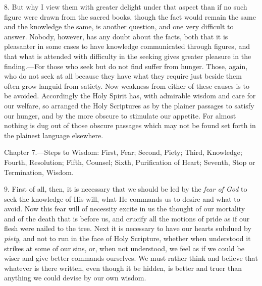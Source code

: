 8. But why I view them with greater delight under that aspect than if no such figure were drawn from the sacred books, though the fact would remain the same and the knowledge the same, is another question, and one very difficult to answer. Nobody, however, has any doubt about the facts, both that it is pleasanter in some cases to have knowledge communicated through figures, and that what is attended with difficulty in the seeking gives greater pleasure in the finding.—For those who seek but do not find suffer from hunger. Those, again, who do not seek at all because they have what they require just beside them often grow languid from satiety. Now weakness from either of these causes is to be avoided. Accordingly the Holy Spirit has, with admirable wisdom and care for our welfare, so arranged the Holy Scriptures as by the plainer passages to satisfy our hunger, and by the more obscure to stimulate our appetite. For almost nothing is dug out of those obscure passages which may not be found set forth in the plainest language elsewhere.


Chapter 7.—Steps to Wisdom: First, Fear; Second, Piety; Third, Knowledge; Fourth, Resolution; Fifth, Counsel; Sixth, Purification of Heart; Seventh, Stop or Termination, Wisdom.

9. First of all, then, it is necessary that we should be led by the \emph{fear of God} to seek the knowledge of His will, what He commands us to desire and what to avoid. Now this fear will of necessity excite in us the thought of our mortality and of the death that is before us, and crucify all the motions of pride as if our flesh were nailed to the tree. Next it is necessary to have our hearts subdued by \emph{ piety}, and not to run in the face of Holy Scripture, whether when understood it strikes at some of our sins, or, when not understood, we feel as if we could be wiser and give better commands ourselves. We must rather think and believe that whatever is there written, even though it be hidden, is better and truer than anything we could devise by our own wisdom.

